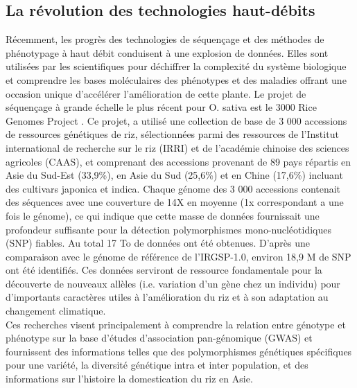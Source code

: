 \subsection{La révolution des technologies haut-débits}
Récemment, les progrès des technologies de séquençage et des méthodes de phénotypage à haut débit conduisent à une explosion de données. Elles sont utilisées par les scientifiques pour déchiffrer la complexité du système biologique et comprendre les bases moléculaires des phénotypes et des maladies offrant une occasion unique d’accélérer l’amélioration de cette plante. Le projet de séquençage à grande échelle le plus récent pour O. sativa est le 3000 Rice Genomes Project \cite{3KRG_2018}. Ce projet, a utilisé une collection de base de 3 000 accessions de ressources génétiques de riz, sélectionnées parmi des ressources de l'Institut international de recherche sur le riz (IRRI) et de l'académie chinoise des sciences agricoles (CAAS), et comprenant des accessions provenant de 89 pays répartis en Asie du Sud-Est (33,9\%), en Asie du Sud (25,6\%) et en Chine (17,6\%) incluant des cultivars japonica et indica. Chaque génome des 3 000 accessions contenait des séquences avec une couverture de 14X en moyenne (1x correspondant a une fois le génome), ce qui indique que cette masse de données fournissait une profondeur suffisante pour la détection polymorphismes mono-nucléotidiques (SNP) fiables. Au total 17 To de données ont été obtenues. D'après une comparaison avec le génome de référence de l'IRGSP-1.0, environ 18,9 M de SNP ont été identifiés. Ces données serviront de ressource fondamentale pour la découverte de nouveaux allèles (i.e. variation d'un gène chez un individu) pour d'importants caractères utiles à l'amélioration du riz et à son adaptation au changement climatique. \\ 

Ces recherches visent principalement à comprendre la relation entre génotype et phénotype sur la base d'études d'association pan-génomique (GWAS) et fournissent des informations telles que des polymorphismes génétiques spécifiques pour une variété, la diversité génétique intra et inter population, et des informations sur l'histoire la domestication du riz en Asie.

